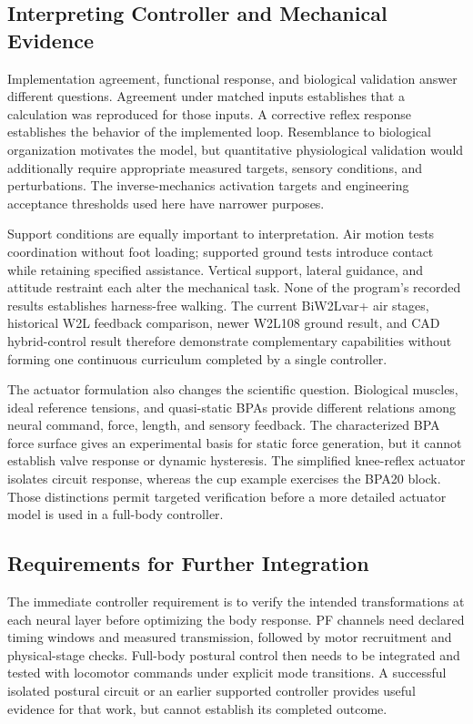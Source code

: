 \subsection{Interpreting Controller and Mechanical Evidence}

Implementation agreement, functional response, and biological validation answer different questions. Agreement under matched inputs establishes that a calculation was reproduced for those inputs. A corrective reflex response establishes the behavior of the implemented loop. Resemblance to biological organization motivates the model, but quantitative physiological validation would additionally require appropriate measured targets, sensory conditions, and perturbations. The inverse-mechanics activation targets and engineering acceptance thresholds used here have narrower purposes.

Support conditions are equally important to interpretation. Air motion tests coordination without foot loading; supported ground tests introduce contact while retaining specified assistance. Vertical support, lateral guidance, and attitude restraint each alter the mechanical task. None of the program's recorded results establishes harness-free walking. The current BiW2Lvar+ air stages, historical W2L feedback comparison, newer W2L108 ground result, and CAD hybrid-control result therefore demonstrate complementary capabilities without forming one continuous curriculum completed by a single controller.

The actuator formulation also changes the scientific question. Biological muscles, ideal reference tensions, and quasi-static BPAs provide different relations among neural command, force, length, and sensory feedback. The characterized BPA force surface gives an experimental basis for static force generation, but it cannot establish valve response or dynamic hysteresis. The simplified knee-reflex actuator isolates circuit response, whereas the cup example exercises the BPA20 block. Those distinctions permit targeted verification before a more detailed actuator model is used in a full-body controller.

\subsection{Requirements for Further Integration}

The immediate controller requirement is to verify the intended transformations at each neural layer before optimizing the body response. PF channels need declared timing windows and measured transmission, followed by motor recruitment and physical-stage checks. Full-body postural control then needs to be integrated and tested with locomotor commands under explicit mode transitions. A successful isolated postural circuit or an earlier supported controller provides useful evidence for that work, but cannot establish its completed outcome.

